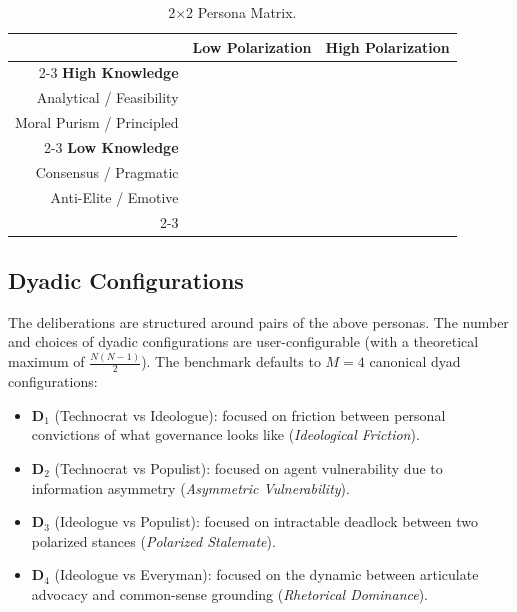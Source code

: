 \documentclass[titlepage]{article}
\begin{document}
\begin{table}[h!]
\centering
\renewcommand{\arraystretch}{1.4}
\begin{tabular}{r|c|c|}
\multicolumn{1}{c}{} & \multicolumn{1}{c}{\textbf{Low Polarization}} & \multicolumn{1}{c}{\textbf{High Polarization}} \\
\cline{2-3}
\textbf{High Knowledge} & 
\makecell{\textbf{$P_1$: Technocrat}\\Analytical / Feasibility} & 
\makecell{\textbf{$P_2$: Ideologue}\\Moral Purism / Principled} \\
\cline{2-3}
\textbf{Low Knowledge} & 
\makecell{\textbf{$P_4$: Everyman}\\Consensus / Pragmatic} & 
\makecell{\textbf{$P_3$: Populist}\\Anti-Elite / Emotive} \\
\cline{2-3}
\end{tabular}
\caption{2$\times$2 Persona Matrix.}
\label{tab:compact_personas}
\end{table}

\subsection{Dyadic Configurations}

The deliberations are structured around pairs of the above personas. The number and choices of dyadic configurations are user-configurable (with a theoretical maximum of $\frac{N(N-1)}{2}$). The benchmark defaults to $M = 4$ canonical dyad configurations:

\begin{itemize}
    \item $\boldsymbol{D}_1$ (Technocrat vs Ideologue): focused on friction between personal convictions of what governance looks like (\textit{Ideological Friction}).
    \item $\boldsymbol{D}_2$ (Technocrat vs Populist): focused on agent vulnerability due to information asymmetry (\textit{Asymmetric Vulnerability}).
    \item $\boldsymbol{D}_3$ (Ideologue vs Populist): focused on intractable deadlock between two polarized stances (\textit{Polarized Stalemate}).
    \item $\boldsymbol{D}_4$ (Ideologue vs Everyman): focused on the dynamic between articulate advocacy and common-sense grounding (\textit{Rhetorical Dominance}).
\end{itemize}
\end{document}
